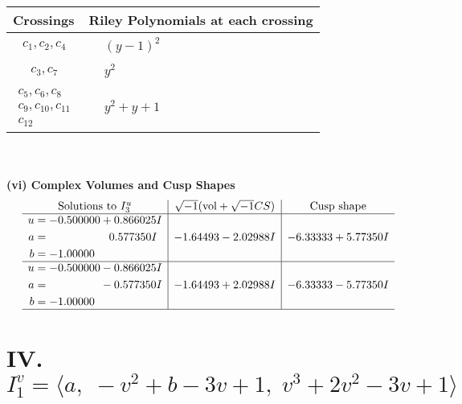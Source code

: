 \documentclass[1p]{elsarticle_modified}
\theoremstyle{definition}
\newcommand{\I}{\sqrt{-1}}
\begin{document}
\begin{tabular}{m{50pt}|m{274pt}}
Crossings & \hspace{64pt}Riley Polynomials at each crossing \\
\hline $$\begin{aligned}c_{1},c_{2},c_{4}\end{aligned}$$&$\begin{aligned}
&(y-1)^2
\end{aligned}$\\
\hline $$\begin{aligned}c_{3},c_{7}\end{aligned}$$&$\begin{aligned}
&y^2
\end{aligned}$\\
\hline $$\begin{aligned}c_{5},c_{6},c_{8}\\c_{9},c_{10},c_{11}\\c_{12}\end{aligned}$$&$\begin{aligned}
&y^2+y+1
\end{aligned}$\\
\hline
\end{tabular}\\~\\
\newpage\flushleft \textbf{(vi) Complex Volumes and Cusp Shapes}
$$\begin{array}{c|c|c}  
\text{Solutions to }I^u_{3}& \I (\text{vol} + \sqrt{-1}CS) & \text{Cusp shape}\\
 \hline 
\begin{aligned}
u &= -0.500000 + 0.866025 I \\
a &= \phantom{-0.000000 -}0.577350 I \\
b &= -1.00000\phantom{ +0.000000I}\end{aligned}
 & -1.64493 - 2.02988 I & -6.33333 + 5.77350 I \\ \hline\begin{aligned}
u &= -0.500000 - 0.866025 I \\
a &= \phantom{-0.000000 } -0.577350 I \\
b &= -1.00000\phantom{ +0.000000I}\end{aligned}
 & -1.64493 + 2.02988 I & -6.33333 - 5.77350 I\\
 \hline 
 \end{array}$$\newpage\newpage\renewcommand{\arraystretch}{1}
\centering \section*{IV. $I^v_{1}= \langle a,\;- v^2+b-3 v+1,\;v^3+2 v^2-3 v+1 \rangle$}
\end{document}

